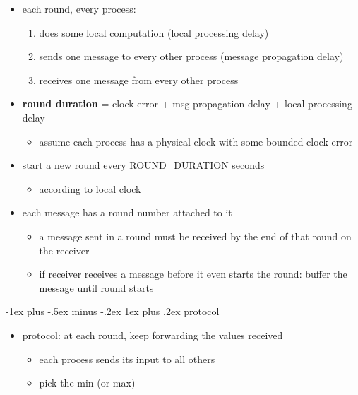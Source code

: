 \documentclass[10pt, landscape]{article}
\makeatletter
\renewcommand{\subsubsection}{\@startsection{subsubsection}{3}{0mm}%
  {-1ex plus -.5ex minus -.2ex}%
  {1ex plus .2ex}%
{\normalfont\small\bfseries}}%
\makeatother
\begin{document}
\begin{multicols*}{3}
  \begin{itemize}
    \item each round, every process:
      \begin{enumerate}
        \item does some local computation (local processing delay)
        \item sends one message to every other process (message propagation delay)
        \item receives one message from every other process
      \end{enumerate}
    \item \textbf{round duration} = clock error + msg propagation delay + local processing delay
      \begin{itemize}
        \item assume each process has a physical clock with some bounded clock error
      \end{itemize}
    \item start a new round every ROUND\_DURATION seconds
      \begin{itemize}
        \item according to local clock
      \end{itemize}
    \item each message has a round number attached to it
      \begin{itemize}
        \item a message sent in a round must be received by the end of that round on the receiver
        \item if receiver receives a message before it even starts the round: buffer the message until round starts
      \end{itemize}
  \end{itemize}

  \subsubsection{protocol}

  \begin{itemize}
    \item protocol: at each round, keep forwarding the values received
      \begin{itemize}
        \item each process sends its input to all others
        \item pick the min (or max)
      \end{itemize}
  \end{itemize}


\end{multicols*}
\end{document}
